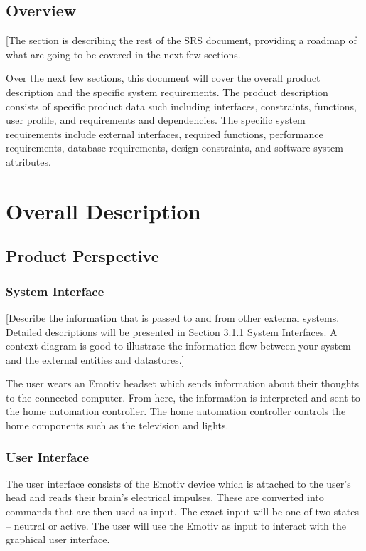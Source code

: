 \documentclass{article}
\begin{document}
\subsection{Overview}
[The section is describing the rest of the SRS document, providing a roadmap of what are going to be 
covered in the next few sections.]

Over the next few sections, this document will cover the overall product description and the 
specific system requirements. The product description consists of specific product data such including 
interfaces, constraints, functions, user profile, and requirements and dependencies. The specific system 
requirements include external interfaces, required functions, performance requirements, database 
requirements, design constraints, and software system attributes.

\newpage

\section{Overall Description}

\subsection{Product Perspective}

\subsubsection{System Interface}

[Describe the information that is passed to and from other external systems. Detailed descriptions 
will be presented in Section 3.1.1 System Interfaces. A context diagram is good to illustrate the 
information flow between your system and the external entities and datastores.]

The user wears an Emotiv headset which sends information about their thoughts to the connected computer. From here, the information is interpreted and sent to the home automation controller. The home automation controller controls the home components such as the television and lights. 

\subsubsection{User Interface}

	The user interface consists of the Emotiv device which is attached to the user's head and reads their brain's electrical impulses. These are converted into commands that are then used as input. The exact input will be one of two states – neutral or active. The user will use the Emotiv as input to interact with the graphical user interface.
\end{document}
